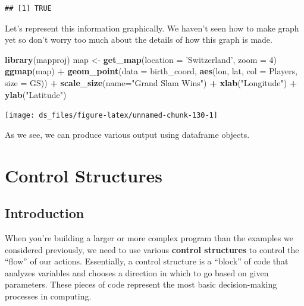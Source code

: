 \documentclass[12pt,]{krantz}
\newenvironment{Shaded}{\begin{snugshade}}{\end{snugshade}}
\newcommand{\KeywordTok}[1]{\textcolor[rgb]{0.27,0.27,0.27}{\textbf{#1}}}
\newcommand{\DataTypeTok}[1]{\textcolor[rgb]{0.27,0.27,0.27}{#1}}
\newcommand{\DecValTok}[1]{\textcolor[rgb]{0.06,0.06,0.06}{#1}}
\newcommand{\StringTok}[1]{\textcolor[rgb]{0.5,0.5,0.5}{#1}}
\newcommand{\OperatorTok}[1]{\textcolor[rgb]{0.43,0.43,0.43}{\textbf{#1}}}
\newcommand{\NormalTok}[1]{#1}
\begin{document}
\begin{verbatim}
## [1] TRUE
\end{verbatim}

Let's represent this information graphically. We haven't seen how to
make graph yet so don't worry too much about the details of how this
graph is made.

\begin{Shaded}
\begin{Highlighting}[]
\KeywordTok{library}\NormalTok{(mapproj)}
\NormalTok{map <-}\StringTok{ }\KeywordTok{get_map}\NormalTok{(}\DataTypeTok{location =} \StringTok{'Switzerland'}\NormalTok{, }\DataTypeTok{zoom =} \DecValTok{4}\NormalTok{)}
\KeywordTok{ggmap}\NormalTok{(map) }\OperatorTok{+}\StringTok{ }\KeywordTok{geom_point}\NormalTok{(}\DataTypeTok{data =}\NormalTok{ birth_coord, }
             \KeywordTok{aes}\NormalTok{(lon, lat, }\DataTypeTok{col =}\NormalTok{ Players, }\DataTypeTok{size =}\NormalTok{ GS)) }\OperatorTok{+}\StringTok{ }
\StringTok{             }\KeywordTok{scale_size}\NormalTok{(}\DataTypeTok{name=}\StringTok{"Grand Slam Wins"}\NormalTok{) }\OperatorTok{+}\StringTok{ }
\StringTok{             }\KeywordTok{xlab}\NormalTok{(}\StringTok{"Longitude"}\NormalTok{) }\OperatorTok{+}\StringTok{ }\KeywordTok{ylab}\NormalTok{(}\StringTok{"Latitude"}\NormalTok{)}
\end{Highlighting}
\end{Shaded}

\begin{center}\texttt{[image: ds\_files/figure-latex/unnamed-chunk-130-1]} \end{center}

As we see, we can produce various output using dataframe objects.

\chapter{Control Structures}\label{control}

\section{Introduction}\label{introduction-1}

When you're building a larger or more complex program than the examples
we considered previously, we need to use various \textbf{control
structures} to control the ``flow'' of our actions. Essentially, a
control structure is a ``block'' of code that analyzes variables and
chooses a direction in which to go based on given parameters. These
pieces of code represent the most basic decision-making processes in
computing.
\end{document}
